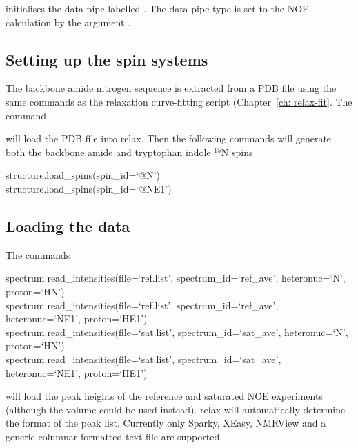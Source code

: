 
initialises the data pipe labelled .  The data pipe type is set to the NOE calculation by the argument .



\subsection{Setting up the spin systems}

The backbone amide nitrogen sequence is extracted from a PDB file using the same commands as the relaxation curve-fitting script (Chapter~\ref{ch: relax-fit}.  The command


will load the PDB file  into relax.  Then the following commands will generate both the backbone amide and tryptophan indole $^{15}$N spins

\begin{exampleenv}
structure.load\_spins(spin\_id=`@N') \\
structure.load\_spins(spin\_id=`@NE1')
\end{exampleenv}



\subsection{Loading the data}

The commands

\begin{exampleenv}
spectrum.read\_intensities(file=`ref.list', spectrum\_id=`ref\_ave', heteronuc=`N', proton=`HN') \\
spectrum.read\_intensities(file=`ref.list', spectrum\_id=`ref\_ave', heteronuc=`NE1', proton=`HE1') \\
spectrum.read\_intensities(file=`sat.list', spectrum\_id=`sat\_ave', heteronuc=`N', proton=`HN') \\
spectrum.read\_intensities(file=`sat.list', spectrum\_id=`sat\_ave', heteronuc=`NE1', proton=`HE1')
\end{exampleenv}

will load the peak heights of the reference and saturated NOE experiments (although the volume could be used instead).  relax will automatically determine the format of the peak list.  Currently only Sparky, XEasy, NMRView and a generic columnar formatted text file are supported.


